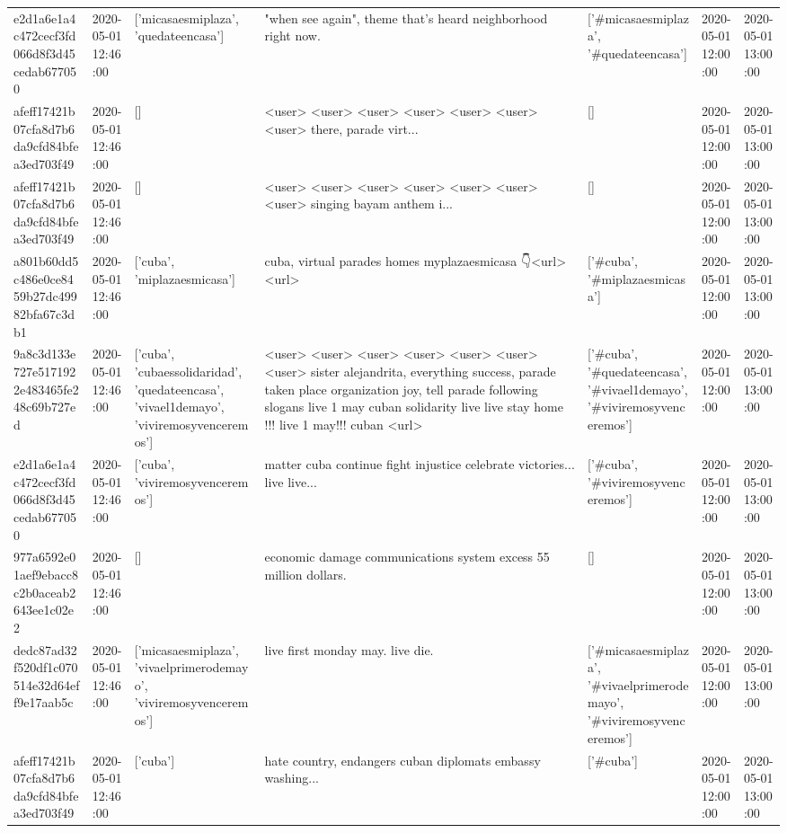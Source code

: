 \begin{tabular}{lllllll}
e2d1a6e1a4c472cecf3fd066d8f3d45cedab677050 & 2020-05-01 12:46:00 & ['micasaesmiplaza', 'quedateencasa'] & "when see again", theme that's heard neighborhood right now. & ['#micasaesmiplaza', '#quedateencasa'] & 2020-05-01 12:00:00 & 2020-05-01 13:00:00 \\
afeff17421b07cfa8d7b6da9cfd84bfea3ed703f49 & 2020-05-01 12:46:00 & [] & <user> <user> <user> <user> <user> <user> <user> there, parade virt... & [] & 2020-05-01 12:00:00 & 2020-05-01 13:00:00 \\
afeff17421b07cfa8d7b6da9cfd84bfea3ed703f49 & 2020-05-01 12:46:00 & [] & <user> <user> <user> <user> <user> <user> <user> singing bayam anthem i... & [] & 2020-05-01 12:00:00 & 2020-05-01 13:00:00 \\
a801b60dd5c486e0ce8459b27dc49982bfa67c3db1 & 2020-05-01 12:46:00 & ['cuba', 'miplazaesmicasa'] & cuba, virtual parades homes myplazaesmicasa 👇<url> <url> & ['#cuba', '#miplazaesmicasa'] & 2020-05-01 12:00:00 & 2020-05-01 13:00:00 \\
9a8c3d133e727e5171922e483465fe248c69b727ed & 2020-05-01 12:46:00 & ['cuba', 'cubaessolidaridad', 'quedateencasa', 'vivael1demayo', 'viviremosyvenceremos'] & <user> <user> <user> <user> <user> <user> <user> sister alejandrita, everything success, parade taken place organization joy, tell parade following slogans live 1 may cuban solidarity live live stay home !!! live 1 may!!! cuban <url> & ['#cuba', '#quedateencasa', '#vivael1demayo', '#viviremosyvenceremos'] & 2020-05-01 12:00:00 & 2020-05-01 13:00:00 \\
e2d1a6e1a4c472cecf3fd066d8f3d45cedab677050 & 2020-05-01 12:46:00 & ['cuba', 'viviremosyvenceremos'] & matter cuba continue fight injustice celebrate victories... live live... & ['#cuba', '#viviremosyvenceremos'] & 2020-05-01 12:00:00 & 2020-05-01 13:00:00 \\
977a6592e01aef9ebacc8c2b0aceab2643ee1c02e2 & 2020-05-01 12:46:00 & [] & economic damage communications system excess 55 million dollars. & [] & 2020-05-01 12:00:00 & 2020-05-01 13:00:00 \\
dedc87ad32f520df1c070514e32d64eff9e17aab5c & 2020-05-01 12:46:00 & ['micasaesmiplaza', 'vivaelprimerodemayo', 'viviremosyvenceremos'] & live first monday may. live die. & ['#micasaesmiplaza', '#vivaelprimerodemayo', '#viviremosyvenceremos'] & 2020-05-01 12:00:00 & 2020-05-01 13:00:00 \\
afeff17421b07cfa8d7b6da9cfd84bfea3ed703f49 & 2020-05-01 12:46:00 & ['cuba'] & hate country, endangers cuban diplomats embassy washing... & ['#cuba'] & 2020-05-01 12:00:00 & 2020-05-01 13:00:00 \\

\end{tabular}

